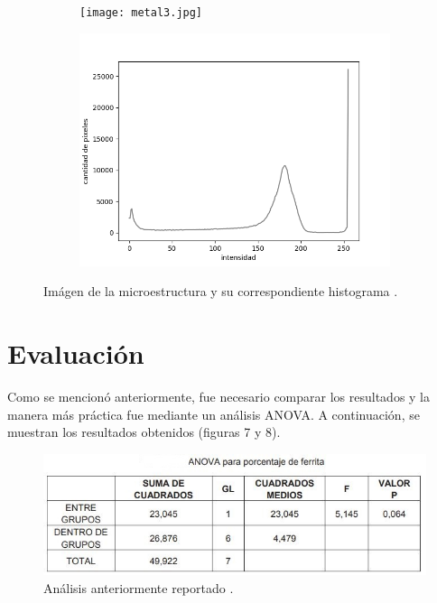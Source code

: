 \documentclass[12pt,twocolumn]{article}
\begin{document}
\begin{figure}[H]
       \centering
       \begin{subfigure}[b]{0.4\linewidth}
           \texttt{[image: metal3.jpg]}
           \label{fig:westminster_lateral}
        \end{subfigure}

        \begin{subfigure}[b]{0.6\linewidth}
            \includegraphics[width=\linewidth]{histograma3.png}
            \label{fig:westminster_lateral}
         \end{subfigure}
         \caption{Im\'agen de la microestructura y su correspondiente histograma \cite{metal}.}
\end{figure}

\section{Evaluaci\'on}

Como se mencion\'o anteriormente, fue necesario comparar los resultados y la manera m\'as pr\'actica fue mediante un an\'alisis ANOVA. A continuaci\'on, se muestran los resultados obtenidos (figuras 7 y 8).
\begin{figure}[H]
  \centering\includegraphics[scale=0.4]{anova1.jpg}
  \caption{An\'alisis anteriormente reportado \cite{ref2}.}
  \label{fig}
\end{figure}
\end{document}
